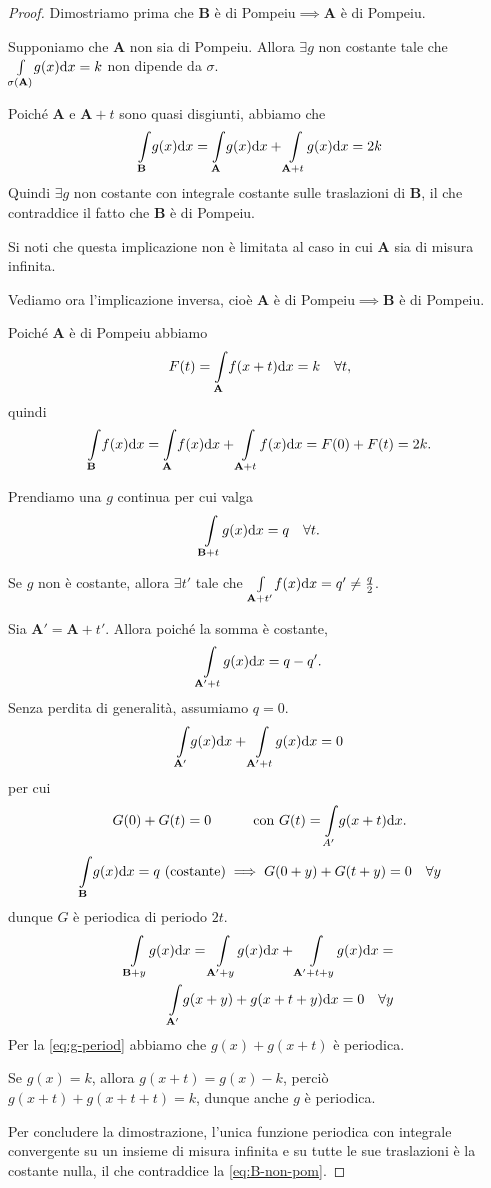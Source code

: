 \documentclass[12pt]{article}
\newcommand\ins[1]{\mathbf #1}
\newcommand\pom{di Pompeiu}
\newcommand\intes[2]{\int\limits_{#1}\!#2\text dx}
\theoremstyle{definition}
\begin{document}
\begin{proof}Dimostriamo prima che $\ins B$ è \pom{}$\implies\ins A$ è \pom{}.

Supponiamo che $\ins A$ non sia \pom{}. Allora $\exists g$ non costante tale che $\intes {\sigma(\ins A)}{g(x)}=k$ non dipende da $\sigma$.

Poiché $\ins A$ e $\ins A+t$ sono quasi disgiunti, abbiamo che
\begin{equation}\label{eq:quasi-disgiunti}
\intes{\ins B}{g(x)}=\intes{\ins A}{g(x)}+\intes{\ins A+t} {g(x)}=2k
\end{equation}
Quindi $\exists g$ non costante con integrale costante sulle traslazioni di $\ins B$, il che contraddice il fatto che $\ins B$ è \pom{}.

Si noti che questa implicazione non è limitata al caso in cui $\ins A$ sia di misura infinita.

Vediamo ora l'implicazione inversa, cioè $\ins A$ è \pom{}$\implies\ins B$ è \pom{}.

Poiché $\ins A$ è \pom{} abbiamo 
\begin{equation}\label{eq:A-pom}
F(t)=\intes{\ins A}{f(x+t)}=k\quad\forall t ,
\end{equation}
quindi \[\intes{\ins B}{f(x)}=\intes{\ins A}{f(x)} + \intes{\ins A+t}{f(x)}=F(0)+F(t)=2k . \]

Prendiamo una $g$ continua per cui valga \begin{equation}\label{eq:B-non-pom}
\intes {\ins B+t}{g(x)}=q\quad\forall t .
\end{equation}

Se $g$ non è costante, allora $\exists t'$ tale che $\intes{\ins A+t'}{f(x)}=q'\not=\frac q2$.%

Sia $\ins{A'}=\ins A+t'$. Allora poiché la somma è costante, \[\intes{\ins{A'}+t}{g(x)}=q-q' . \]
Senza perdita di generalità, assumiamo $q=0$. %
\[\intes{\ins{A'}}{g(x)}+\intes{\ins{A'}+t}{g(x)}=0\] per cui
\[G(0)+G(t)=0\quad\quad\quad\text{con }G(t)=\intes {A'} {g(x+t)} . \]
\[\intes{\ins B}{g(x)}=q\text{ (costante)}\implies G(0+y)+G(t+y)=0\quad\forall y\]
dunque $G$ è periodica di periodo $2t$.
\begin{equation}\label{eq:g-period}
\begin{split}
\intes{\ins B+y}{g(x)}=\intes{\ins{A'}+y}{g(x)}+\intes{\ins{A'}+t+y}{g(x)}=\\
\intes{\ins{A'}}{g(x+y)+g(x+t+y)}=0\quad\forall y
\end{split}\end{equation}
Per la \eqref{eq:g-period} abbiamo che $g(x)+g(x+t)$ è periodica.

Se $g(x)=k$, allora $g(x+t)=g(x)-k$, perciò $g(x+t)+g(x+t+t)=k$, dunque anche $g$ è periodica.

Per concludere la dimostrazione, l'unica funzione periodica con integrale convergente su un insieme di misura infinita e su tutte le sue traslazioni è la costante nulla, il che contraddice la \eqref{eq:B-non-pom}.
\end{proof}
\end{document}
